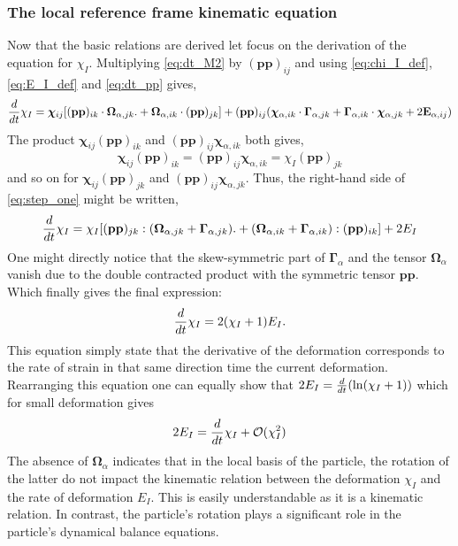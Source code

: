 \subsubsection{The local reference frame kinematic equation}

Now that the basic relations are derived let focus on the derivation of the equation for $\chi_I$. 
Multiplying \ref{eq:dt_M2} by $(\textbf{pp})_{ij}$ and using \ref{eq:chi_I_def},\ref{eq:E_I_def} and  \ref{eq:dt_pp} gives, 
\begin{equation*}
    \frac{d}{dt} \chi_I
    = 
    \bm\chi_{ij} [(\textbf{pp})_{ik}\cdot\bm\Omega_{\alpha,jk}. 
    +\bm\Omega_{\alpha,ik}\cdot (\textbf{pp})_{jk}]
    + (\textbf{pp})_{ij}(\bm\chi_{\alpha,ik} \cdot \bm\Gamma_{\alpha,jk}
    + \bm\Gamma_{\alpha,ik} \cdot \bm\chi_{\alpha,jk}
    + 2\textbf{E}_{\alpha,ij})
    \label{eq:step_one}
\end{equation*}
The product $\bm\chi_{ij} (\textbf{pp})_{ik}$ and $(\textbf{pp})_{ij}\bm\chi_{\alpha,ik}$ both gives, 
\begin{equation*}
    \bm\chi_{ij} (\textbf{pp})_{ik}
    =
    (\textbf{pp})_{ij}\bm\chi_{\alpha,ik}
    = 
    \chi_I (\textbf{pp})_{jk}
\end{equation*}
and so on for $\bm\chi_{ij} (\textbf{pp})_{jk}$ and $(\textbf{pp})_{ij} \bm\chi_{\alpha,jk}$. 
Thus, the right-hand side of \ref{eq:step_one} might be written, 
\begin{equation}
    \frac{d}{dt} \chi_I
    = 
    \chi_I [(\textbf{pp})_{jk}:(\bm\Omega_{\alpha,jk} + \bm\Gamma_{\alpha,jk}). 
    +(\bm\Omega_{\alpha,ik} + \bm\Gamma_{\alpha,ik}) :(\textbf{pp})_{ik}]
    + 2E_I
    \label{eq:step_two}
\end{equation}
One might directly notice that the skew-symmetric part of $\bm\Gamma_\alpha$ and the tensor $\bm\Omega_\alpha$ vanish due to the double contracted product with the symmetric tensor $\textbf{pp}$. 
Which finally gives the final expression: 
\begin{equation}
    \frac{d}{dt} \chi_I
    = 
    2(\chi_I +1)E_I. 
    \label{eq:dt_chi_I}
\end{equation}
This equation simply state that the derivative of the deformation corresponds to the rate of strain in that same direction time the current deformation.  
Rearranging this equation one can equally show that $2E_I = \frac{d}{dt} (\ln(\chi_I+1))$ which for small deformation gives 
\begin{equation}
    2E_I =  \frac{d}{dt} \chi_I + \mathcal{O}(\chi_I^2)
    \label{eq:small_def}
\end{equation}
The absence of $\bm\Omega_\alpha$ indicates that in the local basis of the particle, the rotation of the latter do not impact the kinematic relation between the deformation $\chi_I$ and the rate of deformation $E_I$.
This is easily understandable as it is a kinematic relation. 
In contrast, the particle's rotation plays a significant role in the particle's dynamical balance equations.


